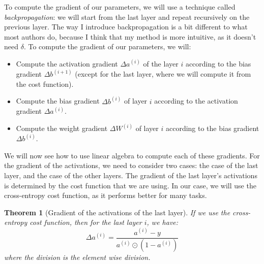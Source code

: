 \documentclass{article}
\newtheorem{theorem}{Theorem}[section]
\theoremstyle{definition}
\theoremstyle{remark}
\theoremstyle{example}
\begin{document}
To compute the gradient of our parameters, we will use a technique called \textit{backpropagation}: we will start from the last layer and repeat recursively on the previous layer. The way I introduce backpropagation is a bit different to what most authors do, because I think that my method is more intuitive, as it doesn't need $\delta$. To compute the gradient of our parameters, we will:
\begin{itemize}
    \item Compute the activation gradient $\Delta a^{(i)}$ of the layer $i$ according to the bias gradient $\Delta b^{(i+1)}$ (except for the last layer, where we will compute it from the cost function).
    \item Compute the bias gradient $\Delta b^{(i)}$ of layer $i$ according to the activation gradient $\Delta a^{(i)}$.
    \item Compute the weight gradient $\Delta W^{(i)}$ of layer $i$ according to the bias gradient $\Delta b^{(i)}$.
\end{itemize}

We will now see how to use linear algebra to compute each of these gradients. For the gradient of the activations, we need to consider two cases: the case of the last layer, and the case of the other layers. The gradient of the last layer's activations is determined by the cost function that we are using. In our case, we will use the cross-entropy cost function, as it performs better for many tasks.

\begin{theorem}[Gradient of the activations of the last layer]
    If we use the cross-entropy cost function, then for the last layer $i$, we have:
        $$\Delta a^{(i)} = \frac{a^{(i)} - y}{a^{(i)} \odot (1 - a^{(i)})}$$
    where the division is the element wise division.
\end{theorem}
\end{document}
